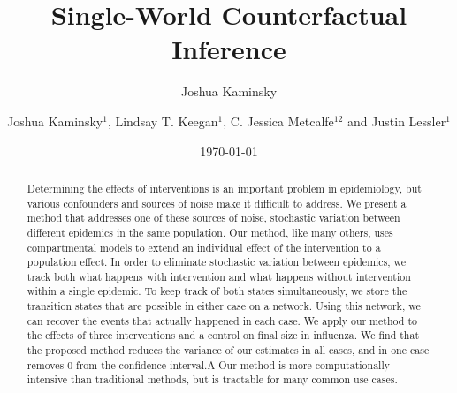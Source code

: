 \documentclass[openacc]{rsproca_new}%
\author{Joshua Kaminsky}
\date{\today}
\title{}
\begin{document}
\title{Single-World Counterfactual Inference}

\author{%
Joshua Kaminsky$^{1}$, Lindsay T. Keegan$^{1}$, C. Jessica Metcalfe$^{12}$ and Justin Lessler$^{1}$}

\address{$^{1}$Department of Epidemiology, Johns Hopkins Bloomberg School of Public Health, Baltimore, MD, USA\\
$^{2}$Department of Ecology and Evolutionary Biology, Princeton University, Princeton, NJ, USA}

\subject{Epidemiology, Infectious Disease Modeling}



\begin{abstract} %
  Determining the effects of interventions is an important problem in epidemiology, but various confounders and sources of noise make it difficult to address. %
  We present a method that addresses one of these sources of noise, stochastic variation between different epidemics in the same population. %
  Our method, like many others, uses compartmental models to extend an individual effect of the intervention to a population effect. %
  In order to eliminate stochastic variation between epidemics, we track both what happens with intervention and what happens without intervention within a single epidemic. %
  To keep track of both states simultaneously, we store the transition states that are possible in either case on a network. %
  Using this network, we can recover the events that actually happened in each case. %
  We apply our method to the effects of three interventions and a control on final size in influenza. %
  We find that the proposed method reduces the variance of our estimates in all cases, and in one case removes $0$ from the confidence interval.A %
  Our method is more computationally intensive than traditional methods, but is tractable for many common use cases. %
\end{abstract}
\end{document}
